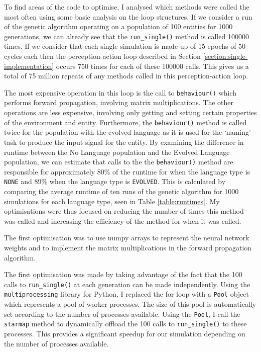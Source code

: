 \documentclass[12pt,a4paper,twoside,openright]{report}
\begin{document}
To find areas of the code to optimise, I analysed which methods were called the most often using some basic analysis on the loop structures. If we consider a run of the genetic algorithm operating on a population of 100 entities for 1000 generations, we can already see that the \texttt{run\_single()} method is called 100000 times. If we consider that each single simulation is made up of 15 epochs of 50 cycles each then the perception-action loop described in Section \ref{section:single-implementation} occurs 750 times for each of these 100000 calls. This gives us a total of 75 million repeats of any methods called in this perception-action loop.

The most expensive operation in this loop is the call to \texttt{behaviour()} which performs forward propagation, involving matrix multiplications. The other operations are less expensive, involving only getting and setting certain properties of the environment and entity. Furthermore, the \texttt{behaviour()} method is called twice for the population with the evolved language as it is used for the `naming' task to produce the input signal for the entity. By examining the difference in runtime between the No Language population and the Evolved Language population, we can estimate that calls to the the \texttt{behaviour()} method are responsible for approximately 80\% of the runtime for when the language type is \texttt{NONE} and 89\% when the language type is \texttt{EVOLVED}. This is calculated by comparing the average runtime of ten runs of the genetic algorithm for 1000 simulations for each language type, seen in Table \ref{table:runtimes}. My optimisations were thus focused on reducing the number of times this method was called and increasing the efficiency of the method for when it was called.

The first optimisation was to use numpy arrays to represent the neural network weights and to implement the matrix multiplications in the forward propagation algorithm. 

The first optimisation was made by taking advantage of the fact that the 100 calls to \texttt{run\_single()} at each generation can be made independently. Using the \texttt{multiprocessing} library for Python, I replaced the for loop with a \texttt{Pool} object which represents a pool of worker processes. The size of this pool is automatically set according to the number of processes available. Using the \texttt{Pool}, I call the \texttt{starmap} method to dynamically offload the 100 calls to \texttt{run\_single()} to these processes. This provides a significant speedup for our simulation depending on the number of processes available. 
\end{document}
